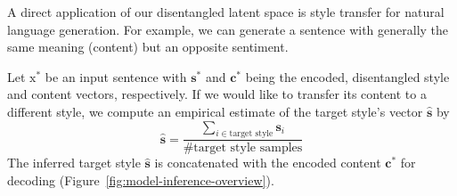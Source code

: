 \documentclass[11pt,a4paper]{article}
\newcommand{\rmx}{\mathrm x}
\begin{document}
A direct application of our disentangled latent space is style transfer for natural language generation. For example, we can generate a sentence with generally the same meaning (content) but an opposite sentiment.

Let $\rmx^*$ be an input sentence with $\bm s^*$ and $\bm c^*$ being the encoded, disentangled style and content vectors, respectively. If we would like to transfer its content to a different style, we compute an empirical estimate of the target style's vector $\hat{\bm s}$ by
\begin{equation*}
	\hat{\bm s}=\frac{\sum_{i\in\text{target style}}\bm s_i}{\text{\# target style samples}}
\end{equation*}
The inferred target style $\hat{\bm s}$ is concatenated with the encoded content $\bm c^*$ for decoding (Figure~\ref{fig:model-inference-overview}).
\end{document}
